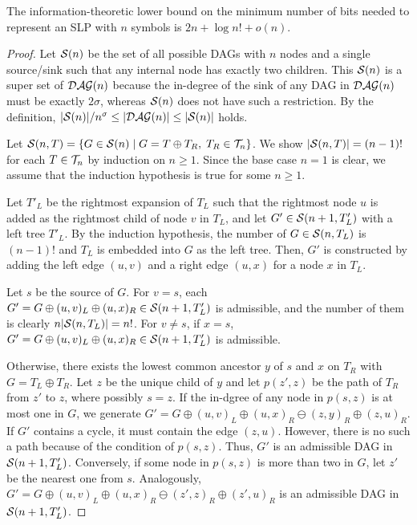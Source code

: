 \documentclass[10pt]{llncs}
\begin{document}
\begin{theorem}\label{th1}
The information-theoretic lower bound on the minimum number of bits needed to
represent an SLP with $n$ symbols is $2n + \log n! + o(n)$.
\end{theorem}
\begin{proof}
Let ${\cal S}(n)$ be the set of all possible DAGs with $n$ nodes
and a single source/sink such that any internal node has exactly two children.
This ${\cal S}(n)$ is a super set of ${\cal DAG}(n)$ because
the in-degree of the sink of any DAG in ${\cal DAG}(n)$ must be
exactly $2\sigma$, whereas ${\cal S}(n)$ does not have such a restriction.
By the definition, 
$|{\cal S}(n)|/n^\sigma \leq 
|{\cal DAG}(n)| \leq 
|{\cal S}(n)|$ holds.

Let ${\cal S}(n,T)=\{G\in {\cal S}(n)\mid G=T\oplus T_R,\;T_R\in {\cal T}_n\}$.
We show $|{\cal S}(n,T)|=(n-1)!$ for each $T\in {\cal T}_n$
by induction on $n\geq 1$.
Since the base case $n=1$ is clear, we assume that the induction hypothesis 
is true for some $n\geq 1$.

Let $T'_L$ be the rightmost expansion of $T_L$ such that
the rightmost node $u$ is added as the rightmost child of node $v$ in $T_L$,
and let $G'\in {\cal S}(n+1,T'_L)$ with a left tree $T'_L$. 
By the induction hypothesis,
the number of $G\in {\cal S}(n,T_L)$ is $(n-1)!$
and $T_L$ is embedded into $G$ as the left tree.
Then, $G'$ is constructed by adding the left edge $(u,v)$
and a right edge $(u,x)$ for a node $x$ in $T_L$.

Let $s$ be the source of $G$.
For $v=s$, each $G'=G\oplus (u,v)_L\oplus (u,x)_R\in {\cal S}(n+1,T'_L)$ is admissible,
and the number of them is clearly $n|{\cal S}(n,T_L)|=n!$.
For $v\neq s$, if $x=s$, 
$G'=G\oplus (u,v)_L\oplus (u,x)_R\in {\cal S}(n+1,T'_L)$ is admissible.

Otherwise, there exists the lowest common ancestor $y$ of $s$ and $x$
on $T_R$ with $G=T_L\oplus T_R$.
Let $z$ be the unique child of $y$ and let $p(z',z)$ be the path of $T_R$ 
from $z'$ to $z$, where possibly $s=z$.
If the in-dgree of any node in $p(s,z)$ is at most one in $G$, 
we generate $G' = G\oplus (u,v)_L \oplus (u,x)_R \ominus (z,y)_R \oplus (z,u)_R$.
If $G'$ contains a cycle, it must contain the edge $(z,u)$.
However, there is no such a path because of the condition of $p(s,z)$.
Thus, $G'$ is an admissible DAG in ${\cal S}(n+1,T'_L)$.
Conversely, if some node in $p(s,z)$ is more than two in $G$, let $z'$ be the nearest one from $s$.
Analogously, $G' = G\oplus (u,v)_L \oplus (u,x)_R \ominus (z',z)_R \oplus (z',u)_R$
is an admissible DAG in ${\cal S}(n+1,T'_L)$.


\end{proof}
\end{document}
